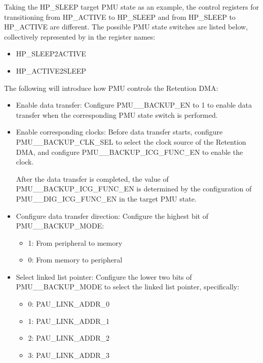 \documentclass[main\_\_EN.tex]{subfiles}
\begin{document}
Taking the HP\_SLEEP target PMU state as an example, the control registers for transitioning from HP\_ACTIVE to HP\_SLEEP and from HP\_SLEEP to HP\_ACTIVE are different. The possible PMU state switches are listed below, collectively represented by  in the register names:

\begin{itemize}
    \item HP\_SLEEP2ACTIVE
    \item HP\_ACTIVE2SLEEP
\end{itemize}

The following will introduce how PMU controls the Retention DMA:

\begin{itemize}
    \item Enable data transfer: Configure PMU\_\_BACKUP\_EN to 1 to enable data transfer when the corresponding PMU state switch is performed.
    \item Enable corresponding clocks: Before data transfer starts, configure PMU\_\_BACKUP\_CLK\_SEL to select the clock source of the Retention DMA, and configure PMU\_\_BACKUP\_ICG\_FUNC\_EN to enable the clock.

    After the data transfer is completed, the value of PMU\_\_BACKUP\_ICG\_FUNC\_EN is determined by the configuration of PMU\_\_DIG\_ICG\_FUNC\_EN in the target PMU state.

    \item Configure data transfer direction: Configure the highest bit of PMU\_\_BACKUP\_MODE:
    \begin{itemize}
        \item 1: From peripheral to memory
        \item 0: From memory to peripheral
    \end{itemize}
    \item Select linked list pointer: Configure the lower two bits of PMU\_\_BACKUP\_MODE to select the linked list pointer, specifically:
        \begin{itemize}
        \item 0: PAU\_LINK\_ADDR\_0
        \item 1: PAU\_LINK\_ADDR\_1
        \item 2: PAU\_LINK\_ADDR\_2
        \item 3: PAU\_LINK\_ADDR\_3
        \end{itemize}
\end{itemize}
\end{document}

